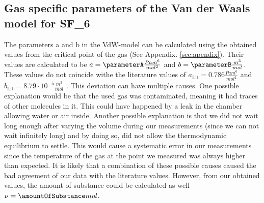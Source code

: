 \documentclass[a4paper,10pt,twocolumn]{article}
\begin{document}
    \subsection{Gas specific parameters of the Van der Waals model for SF_6\)}\label{subsec:gasSpecParams}
    The parameters a and b in the VdW-model can be calculated using the obtained values from the critical point of the gas (See Appendix. \ref{sec:apendix}).
    Their values are calculated to be $a = \parameterA \frac{Pa m^6}{mol^2}$ and $b =\parameterB \frac{m^3}{mol}$.
    These values do not coincide withe the literature values of $a_{\text{Lit}} = 0.786 \frac{Pa m^6}{mol^2}$ and $b_{\text{Lit}} = 8.79\cdot 10^{-5} \frac{m^3}{mol}$ \cite[crc]{2}.
    This deviation can have multiple causes.
    One possible explanation would be that the used gas was contaminated, meaning it had traces of other molecules in it.
    This could have happened by a leak in the chamber allowing water or air inside.
    Another possible explanation is that we did not wait long enough after varying the volume during our measurements (since we can not wait infinitely long) and by doing so, did not allow the thermodynamic equilibrium to settle.
    This would cause a systematic error in our measurements since the temperature of the gas at the point we measured was always higher than expected.
    It is likely that a combination of these possible causes caused the bad agreement of our data with the literature values.
    However, from our obtained values, the amount of substance could be calculated as well $\nu = \amountOfSubstance mol$.
\end{document}
